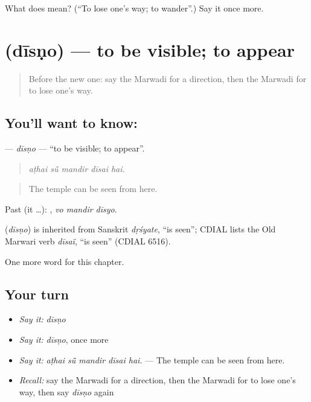 \begin{tcolorbox}[breakable,colback=teal!4,colframe=teal!35!black,title={Before you move on}]
What does  mean? (\textquotedblleft{}To lose one's way; to wander\textquotedblright{}.) Say it once more.
\end{tcolorbox}
\section[\texorpdfstring{\mw{दीसणो} (dīsṇo)}{दीसणो (dīsṇo)}]{ (dīsṇo) — to be visible; to appear}

\label{lesson:MW-C203-disno}



\begin{quote}
Before the new one: say the Marwadi for a direction, then the Marwadi for to lose one's way.
\end{quote}

\subsection*{You'll want to know: }
\textbf{} — \emph{dīsṇo} — \textquotedblleft{}to be visible; to appear\textquotedblright{}.

\begin{quote}
    
\end{quote}

\begin{quote}
\emph{aṭhai sū̃ mandir dīsai hai.}
\end{quote}

\begin{quote}
The temple can be seen from here.
\end{quote}

Past (it …):   , \emph{vo mandir dīsyo}.

\begin{cousinweb}
\textbf{} (\emph{dīsṇo}) is inherited from Sanskrit \emph{dṛśyate}, \textquotedblleft{}is seen\textquotedblright{}; CDIAL lists the Old Marwari verb \emph{dīsaï}, \textquotedblleft{}is seen\textquotedblright{} (CDIAL 6516).
\end{cousinweb}

\begin{grammarlens}[title={What you've built}]
One more word for this chapter.
\end{grammarlens}

\subsection*{Your turn}
\begin{itemize}
\raggedright
  \item \emph{Say it:} \emph{dīsṇo}
  \item \emph{Say it:} \emph{dīsṇo}, once more
  \item \emph{Say it:} \emph{aṭhai sū̃ mandir dīsai hai.} — The temple can be seen from here.
  \item \emph{Recall:} say the Marwadi for a direction, then the Marwadi for to lose one's way, then say \emph{dīsṇo} again
\end{itemize}

